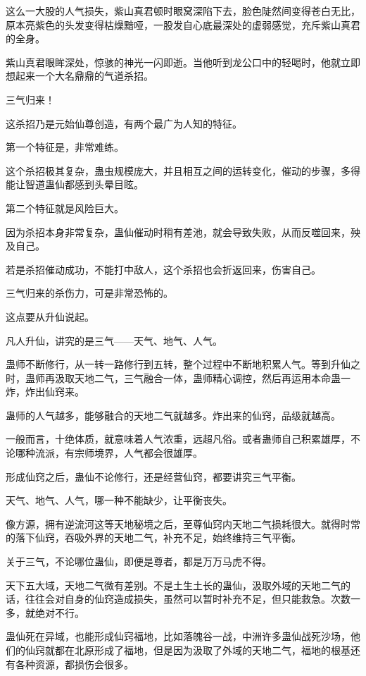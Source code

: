 \begin{this_body}
这么一大股的人气损失，紫山真君顿时眼窝深陷下去，脸色陡然间变得苍白无比，原本亮紫色的头发变得枯燥黯哑，一股发自心底最深处的虚弱感觉，充斥紫山真君的全身。

紫山真君眼眸深处，惊骇的神光一闪即逝。当他听到龙公口中的轻喝时，他就立即想起来一个大名鼎鼎的气道杀招。

三气归来！

这杀招乃是元始仙尊创造，有两个最广为人知的特征。

第一个特征是，非常难练。

这个杀招极其复杂，蛊虫规模庞大，并且相互之间的运转变化，催动的步骤，多得能让智道蛊仙都感到头晕目眩。

第二个特征就是风险巨大。

因为杀招本身非常复杂，蛊仙催动时稍有差池，就会导致失败，从而反噬回来，殃及自己。

若是杀招催动成功，不能打中敌人，这个杀招也会折返回来，伤害自己。

三气归来的杀伤力，可是非常恐怖的。

这点要从升仙说起。

凡人升仙，讲究的是三气——天气、地气、人气。

蛊师不断修行，从一转一路修行到五转，整个过程中不断地积累人气。等到升仙之时，蛊师再汲取天地二气，三气融合一体，蛊师精心调控，然后再运用本命蛊一炸，炸出仙窍来。

蛊师的人气越多，能够融合的天地二气就越多。炸出来的仙窍，品级就越高。

一般而言，十绝体质，就意味着人气浓重，远超凡俗。或者蛊师自己积累雄厚，不论哪种流派，有宗师境界，人气都会很雄厚。

形成仙窍之后，蛊仙不论修行，还是经营仙窍，都要讲究三气平衡。

天气、地气、人气，哪一种不能缺少，让平衡丧失。

像方源，拥有逆流河这等天地秘境之后，至尊仙窍内天地二气损耗很大。就得时常的落下仙窍，吞吸外界的天地二气，补充不足，始终维持三气平衡。

关于三气，不论哪位蛊仙，即便是尊者，都是万万马虎不得。

天下五大域，天地二气微有差别。不是土生土长的蛊仙，汲取外域的天地二气的话，往往会对自身的仙窍造成损失，虽然可以暂时补充不足，但只能救急。次数一多，就绝对不行。

蛊仙死在异域，也能形成仙窍福地，比如落魄谷一战，中洲许多蛊仙战死沙场，他们的仙窍就都在北原形成了福地，但是因为汲取了外域的天地二气，福地的根基还有各种资源，都损伤会很多。


\end{this_body}
